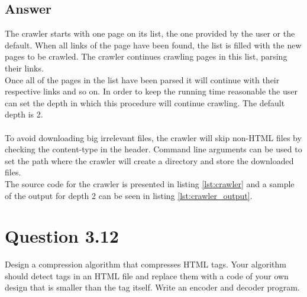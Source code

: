 \documentclass{article}
\begin{document}
\subsection*{Answer}
The crawler starts with one page on its list, the one provided by the user or the default. When all links of the page have been found, the list is filled with the new pages to be crawled. The crawler continues crawling pages in this list, parsing their links.
\\Once all of the pages in the list have been parsed it will continue with their respective links and so on. In order to keep the running time reasonable the user can set the depth in which this procedure will continue crawling. The default depth is 2.\\
\\To avoid downloading big irrelevant files, the crawler will skip non-HTML files by checking the content-type in the header. Command line arguments can be used to set the path where the crawler will create a directory and store the downloaded files.
\\The source code for the crawler is presented in listing \ref{lst:crawler} and a sample of the output for depth 2 can be seen in listing \ref{lst:crawler_output}.\\




\section*{Question 3.12}
Design a compression algorithm that compresses HTML tags. Your algorithm
should detect tags in an HTML file and replace them with a code of your
own design that is smaller than the tag itself. Write an encoder and decoder program.
\end{document}
